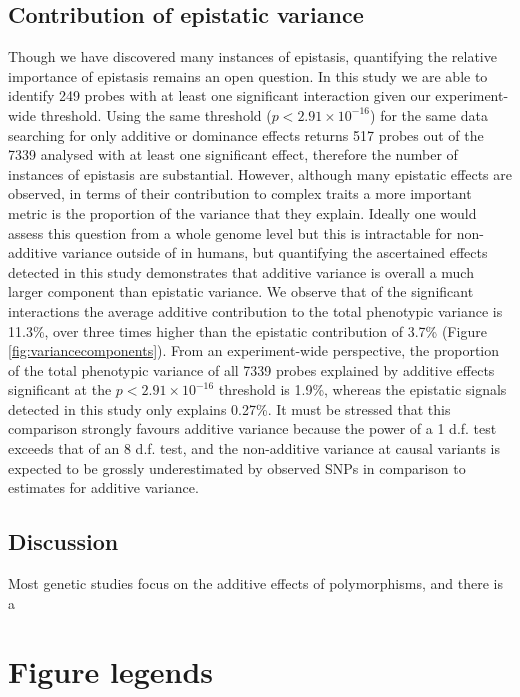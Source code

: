 \documentclass{article}
\begin{document}
\subsection{Contribution of epistatic variance}
Though we have discovered many instances of epistasis, quantifying the relative importance of epistasis remains an open question. In this study we are able to identify 249 probes with at least one significant interaction given our experiment-wide threshold. Using the same threshold ($p < 2.91 \times 10^{-16}$) for the same data searching for only additive or dominance effects returns 517 probes out of the 7339 analysed with at least one significant effect, therefore the number of instances of epistasis are substantial. However, although many epistatic effects are observed, in terms of their contribution to complex traits a more important metric is the proportion of the variance that they explain. Ideally one would assess this question from a whole genome level but this is intractable for non-additive variance outside of in humans, but quantifying the ascertained effects detected in this study demonstrates that additive variance is overall a much larger component than epistatic variance. We observe that of the significant interactions the average additive contribution to the total phenotypic variance is 11.3\%, over three times higher than the epistatic contribution of 3.7\% (Figure \ref{fig:variancecomponents}). From an experiment-wide perspective, the proportion of the total phenotypic variance of all 7339 probes explained by additive effects significant at the $p < 2.91 \times 10^{-16}$ threshold is 1.9\%, whereas the epistatic signals detected in this study only explains 0.27\%. It must be stressed that this comparison strongly favours additive variance because the power of a 1 d.f. test exceeds that of an 8 d.f. test, and the non-additive variance at causal variants is expected to be grossly underestimated by observed SNPs in comparison to estimates for additive variance.


\subsection{Discussion}
Most genetic studies focus on the additive effects of polymorphisms, and there is a 




\clearpage
\section{Figure legends}
\end{document}
